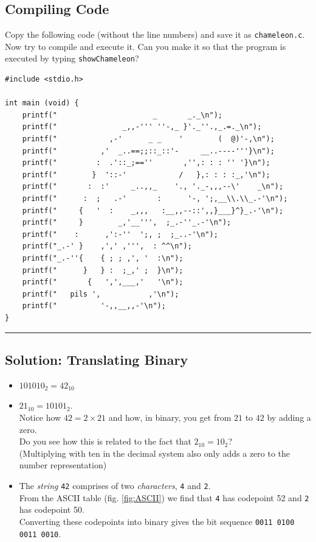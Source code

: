 \subsection*{Compiling Code}
Copy the following code (without the line numbers) and save it as \texttt{chameleon.c}. Now try to compile and execute it. Can you make it so that the program is executed by typing \texttt{showChameleon}?

\begin{codebox}[chameleon.c]
\begin{verbatim}
#include <stdio.h>

int main (void) {
	printf("                      _       _._\n");
	printf("               _,,-''' ''-,_ }'._''.,_.=._\n");
	printf("            ,-'      _ _    '        (  @)'-,\n");
	printf("          ,'  _..==;;::_::'-     __..----'''}\n");
	printf("         :  .'::_;==''       ,'',: : : '' '}\n");
	printf("        }  '::-'            /   },: : : :_,'\n");
	printf("       :  :'     _..,,_    '., '._-,,,--\'    _\n");
	printf("      :  ;   .-'       :      '-, ';,__\\.\\_.-'\n");
	printf("     {   '  :    _,,,   :__,,--::',,}___}^}_.-'\n");
	printf("     }        _,'__''',  ;_.-''_.-'\n");
	printf("    :      ,':-''  ';, ;  ;_..-'\n");
	printf("_.-' }    ,',' ,''',  : ^^\n");
	printf("_.-''{    { ; ; ,', '  :\n");
	printf("      }   } :  ;_,' ;  }\n");
	printf("       {   ',',___,'   '\n");
	printf("   pils ',           ,'\n");
	printf("          '-,,__,,-'\n");
}
\end{verbatim}
\end{codebox}

\rule{\linewidth}{0.1mm}

\subsection*{Solution: Translating Binary}
\begin{itemize}
\item $101010_2 = 42_{10}$
\item $21_{10} = 10101_2$. \\
	Notice how $42 = 2 \times 21$ and how, in binary, you get from $21$ to $42$ by adding a zero.\\
	Do you see how this is related to the fact that $2_{10} = 10_2$?\\
	(Multiplying with ten in the decimal system also only adds a zero to the number representation)
\item The \emph{string} \texttt{42} comprises of two \emph{characters}, \texttt{4} and \texttt{2}.\\
	From the ASCII table (fig. \ref{fig:ASCII}) we find that \texttt{4} has codepoint 52 and \texttt{2} has codepoint 50.\\
	Converting these codepoints into binary gives the bit sequence \texttt{0011 0100  0011 0010}.
\end{itemize}

